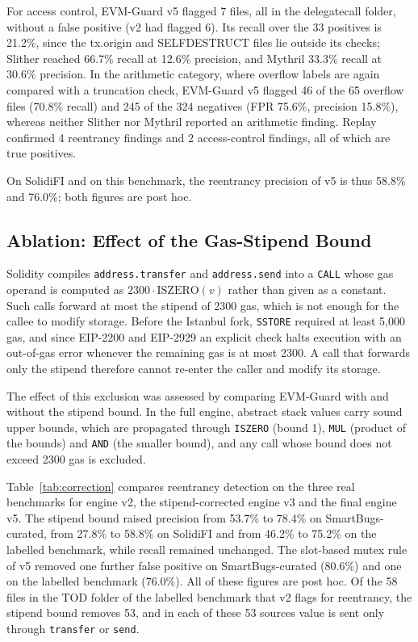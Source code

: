 \documentclass[pdflatex,sn-mathphys]{sn-jnl}
\theoremstyle{thmstyletwo}
\theoremstyle{thmstyletwo}
\begin{document}
For access control, EVM-Guard v5 flagged 7 files, all in the delegatecall folder, without a false positive (v2 had flagged 6). Its recall over the 33 positives is 21.2\%, since the tx.origin and SELFDESTRUCT files lie outside its checks; Slither reached 66.7\% recall at 12.6\% precision, and Mythril 33.3\% recall at 30.6\% precision. In the arithmetic category, where overflow labels are again compared with a truncation check, EVM-Guard v5 flagged 46 of the 65 overflow files (70.8\% recall) and 245 of the 324 negatives (FPR 75.6\%, precision 15.8\%), whereas neither Slither nor Mythril reported an arithmetic finding. Replay confirmed 4 reentrancy findings and 2 access-control findings, all of which are true positives.

On SolidiFI and on this benchmark, the reentrancy precision of v5 is thus 58.8\% and 76.0\%; both figures are post hoc.

\subsection{Ablation: Effect of the Gas-Stipend Bound}\label{sec:results:correction}
Solidity compiles \texttt{address.transfer} and \texttt{address.send} into a \texttt{CALL} whose gas operand is computed as $2300 \cdot \mathrm{ISZERO}(v)$ rather than given as a constant. Such calls forward at most the stipend of 2300 gas, which is not enough for the callee to modify storage. Before the Istanbul fork, \texttt{SSTORE} required at least 5,000 gas, and since EIP-2200 and EIP-2929 an explicit check halts execution with an out-of-gas error whenever the remaining gas is at most 2300. A call that forwards only the stipend therefore cannot re-enter the caller and modify its storage.

The effect of this exclusion was assessed by comparing EVM-Guard with and without the stipend bound. In the full engine, abstract stack values carry sound upper bounds, which are propagated through \texttt{ISZERO} (bound 1), \texttt{MUL} (product of the bounds) and \texttt{AND} (the smaller bound), and any call whose bound does not exceed 2300 gas is excluded.

Table~\ref{tab:correction} compares reentrancy detection on the three real benchmarks for engine v2, the stipend-corrected engine v3 and the final engine v5. The stipend bound raised precision from 53.7\% to 78.4\% on SmartBugs-curated, from 27.8\% to 58.8\% on SolidiFI and from 46.2\% to 75.2\% on the labelled benchmark, while recall remained unchanged. The slot-based mutex rule of v5 removed one further false positive on SmartBugs-curated (80.6\%) and one on the labelled benchmark (76.0\%). All of these figures are post hoc. Of the 58 files in the TOD folder of the labelled benchmark that v2 flags for reentrancy, the stipend bound removes 53, and in each of these 53 sources value is sent only through \texttt{transfer} or \texttt{send}.
\end{document}
